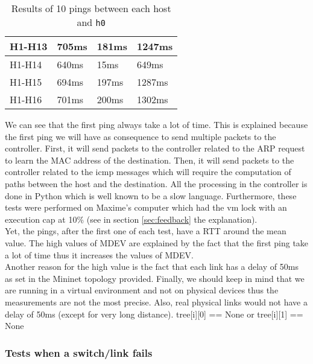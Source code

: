 \documentclass[a4paper, 11pt, oneside]{article}
\begin{document}
\begin{table}[]
\begin{tabular}{|l|l|l|l|}
H1-H13                                     & 705ms                              & 181ms                              & 1247ms                                 \\ \hline
H1-H14                                     & 640ms                              & 15ms                              & 649ms                                 \\ \hline
H1-H15                                     & 694ms                              & 197ms                              & 1287ms                                 \\ \hline
H1-H16                                     & 701ms                              & 200ms                              & 1302ms                                 \\ \hline
\end{tabular}
\caption{Results of 10 pings between each host and \texttt{h0}}
\label{table:STCPings}
\end{table}
We can see that the first ping always take a lot of time. This is explained because the first ping we will have as consequence to send multiple packets to the controller. First, it will send packets to the controller related to the ARP request to learn the MAC address of the destination. Then, it will send packets to the controller related to the icmp messages which will require the computation of paths between the host and the destination. All the processing in the controller is done in Python which is well known to be a slow language. Furthermore, these tests were performed on Maxime's computer which had the vm lock with an execution cap at 10\% (see in section \ref{sec:feedback} the explanation).\\
Yet, the pings, after the first one of each test, have a RTT around the mean value. The high values of MDEV are explained by the fact that the first ping take a lot of time thus it increases the values of MDEV.\\
Another reason for the high value is the fact that each link has a delay of 50ms as set in the Mininet topology provided. Finally, we should keep in mind that we are running in a virtual environment and not on physical devices thus the measurements are not the most precise. Also, real physical links would not have a delay of 50ms (except for very long distance).
tree[i][0] == None or tree[i][1] == None
\subsubsection{Tests when a switch/link fails}
\end{document}
